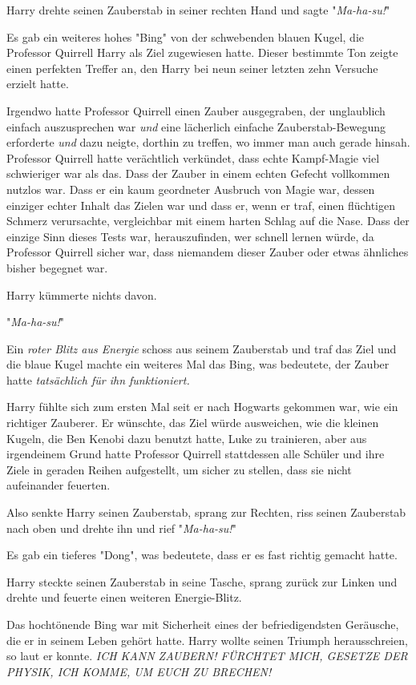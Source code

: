{Harry drehte seinen Zauberstab in seiner rechten Hand und sagte "\emph{Ma-ha-su!}"

Es gab ein weiteres hohes "Bing" von der schwebenden blauen Kugel, die Professor Quirrell Harry als Ziel zugewiesen hatte. Dieser bestimmte Ton zeigte einen perfekten Treffer an, den Harry bei neun seiner letzten zehn Versuche erzielt hatte.

Irgendwo hatte Professor Quirrell einen Zauber ausgegraben, der unglaublich einfach auszusprechen war \emph{und} eine lächerlich einfache Zauberstab-Bewegung erforderte \emph{und} dazu neigte, dorthin zu treffen, wo immer man auch gerade hinsah. Professor Quirrell hatte verächtlich verkündet, dass echte Kampf-Magie viel schwieriger war als das. Dass der Zauber in einem echten Gefecht vollkommen nutzlos war. Dass er ein kaum geordneter Ausbruch von Magie war, dessen einziger echter Inhalt das Zielen war und dass er, wenn er traf, einen flüchtigen Schmerz verursachte, vergleichbar mit einem harten Schlag auf die Nase. Dass der einzige Sinn dieses Tests war, herauszufinden, wer schnell lernen würde, da Professor Quirrell sicher war, dass niemandem dieser Zauber oder etwas ähnliches bisher begegnet war.

Harry kümmerte nichts davon.

"\emph{Ma-ha-su!}"

Ein \emph{roter Blitz aus Energie} schoss aus seinem Zauberstab und traf das Ziel und die blaue Kugel machte ein weiteres Mal das Bing, was bedeutete, der Zauber hatte \emph{tatsächlich für ihn funktioniert.}

Harry fühlte sich zum ersten Mal seit er nach Hogwarts gekommen war, wie ein richtiger Zauberer. Er wünschte, das Ziel würde ausweichen, wie die kleinen Kugeln, die Ben Kenobi dazu benutzt hatte, Luke zu trainieren, aber aus irgendeinem Grund hatte Professor Quirrell stattdessen alle Schüler und ihre Ziele in geraden Reihen aufgestellt, um sicher zu stellen, dass sie nicht aufeinander feuerten.

Also senkte Harry seinen Zauberstab, sprang zur Rechten, riss seinen Zauberstab nach oben und drehte ihn und rief "\emph{Ma-ha-su!}"

Es gab ein tieferes "Dong", was bedeutete, dass er es fast richtig gemacht hatte.

Harry steckte seinen Zauberstab in seine Tasche, sprang zurück zur Linken und drehte und feuerte einen weiteren Energie-Blitz.

Das hochtönende Bing war mit Sicherheit eines der befriedigendsten Geräusche, die er in seinem Leben gehört hatte. Harry wollte seinen Triumph herausschreien, so laut er konnte. \emph{ICH KANN ZAUBERN! FÜRCHTET MICH, GESETZE DER PHYSIK, ICH KOMME, UM EUCH ZU BRECHEN!}

}
